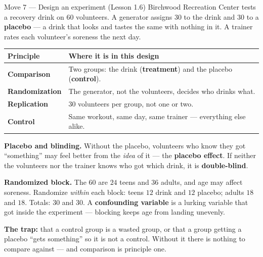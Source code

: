 \documentclass[10pt]{article}
\begin{document}
\vspace{3pt}
\boxguard[16]
\begin{notesbox}{Move 7 --- Design an experiment (Lesson 1.6)}
\small
Birchwood Recreation Center tests a recovery drink on $60$ volunteers. A generator assigns
$30$ to the drink and $30$ to a \textbf{placebo} --- a drink that looks and tastes the same with
nothing in it. A trainer rates each volunteer's soreness the next day.

\vspace{2pt}
\renewcommand{\arraystretch}{1.2}
\begin{tabularx}{\linewidth}{@{} >{\bfseries}p{2.6cm} X @{}}
\rowcolor{frost}
\textbf{Principle} & \textbf{Where it is in this design} \\
\midrule
Comparison & Two groups: the drink (\textbf{treatment}) and the placebo (\textbf{control}). \\
Randomization & The generator, not the volunteers, decides who drinks what. \\
Replication & $30$ volunteers per group, not one or two. \\
Control & Same workout, same day, same trainer --- everything else alike. \\
\end{tabularx}

\vspace{3pt}
\textbf{Placebo and blinding.} Without the placebo, volunteers who know they got ``something''
may feel better from the \emph{idea} of it --- the \textbf{placebo effect}. If neither the
volunteers nor the trainer knows who got which drink, it is \textbf{double-blind}.

\vspace{2pt}
\textbf{Randomized block.} The $60$ are $24$ teens and $36$ adults, and age may affect soreness.
Randomize \emph{within} each block: teens $12$ drink and $12$ placebo; adults $18$ and $18$.
Totals: $30$ and $30$. A \textbf{confounding variable} is a lurking variable that got inside
the experiment --- blocking keeps age from landing unevenly.

\vspace{2pt}
\textbf{The trap:} that a control group is a wasted group, or that a group getting a placebo
``gets something'' so it is not a control. Without it there is nothing to compare against ---
and comparison is principle one.
\end{notesbox}
\end{document}
